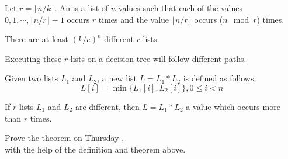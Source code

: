 \begin{frame}{}
  \vspace{0.30cm}

  \begin{definition}[$r$-list]
    Let $r = \lfloor n/k \rfloor$.
    An  is a list of $n$ values such that
    each of the values $0, 1, \cdots, \lfloor n/r \rfloor - 1$ occurs $r$ times 
    and the value $\lfloor n/r \rfloor$ occurs ($n \mod r$) times.
  \end{definition}

  \begin{lemma}
    There are at least $(k/e)^{n}$ different $r$-lists.
  \end{lemma}

  \begin{theorem}
    Executing these $r$-lists on a decision tree will follow different paths.
  \end{theorem}
\end{frame}

\begin{frame}{}
  \vspace{0.30cm}

  \begin{definition}[$L = L_1 \ast L_2$]
    Given two lists $L_1$ and $L_2$, a new list $L = L_1 \ast L_2$ is defined as follows:
    \[
      L[i] = \min \big\{ L_1[i], L_2[i] \big\}, 0 \le i < n
    \]
  \end{definition}

  \begin{theorem}
    If $r$-lists $L_1$ and $L_2$ are different, then $L = L_1 \ast L_2$  a value which occurs more than $r$ times.
  \end{theorem}

  \begin{center}
    Prove the theorem on Thursday , \\
    with the help of the definition and theorem above.
  \end{center}
\end{frame}
